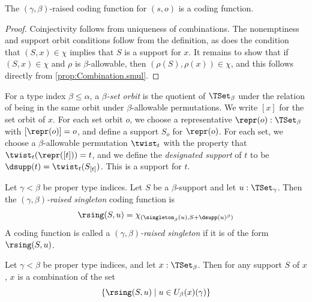 \begin{proposition}
  \label{prop:raisedCodingFunction_spec}
  The \( (\gamma,\beta) \)-raised coding function for \( (s, o) \) is a coding function.
\end{proposition}
\begin{proof}
  Coinjectivity follows from uniqueness of combinations.
  The nonemptiness and support orbit conditions follow from the definition, as does the condition that \( (S, x) \in \chi \) implies that \( S \) is a support for \( x \).
  It remains to show that if \( (S, x) \in \chi \) and \( \rho \) is \( \beta \)-allowable, then \( (\rho(S), \rho(x)) \in \chi \), and this follows directly from \cref{prop:Combination.smul}.
\end{proof}
\begin{definition}
  \label{def:designatedSupport}
  For a type index \( \beta \leq \alpha \), a \emph{\( \beta \)-set orbit} is the quotient of \( \TSet_\beta \) under the relation of being in the same orbit under \( \beta \)-allowable permutations.
  We write \( [x] \) for the set orbit of \( x \).
  For each set orbit \( o \), we choose a representative \( \repr(o) : \TSet_\beta \) with \( [\repr(o)] = o \), and define a support \( S_o \) for \( \repr(o) \).
  For each set, we choose a \( \beta \)-allowable permutation \( \twist_t \) with the property that \( \twist_t(\repr([t])) = t \), and we define the \emph{designated support} of \( t \) to be \( \dsupp(t) = \twist_t(S_{[t]}) \).
  This is a support for \( t \).
\end{definition}
\begin{definition}
  \label{def:raisedSingleton}
  Let \( \gamma < \beta \) be proper type indices.
  Let \( S \) be a \( \beta \)-support and let \( u : \TSet_\gamma \).
  Then the \emph{\( (\gamma,\beta ) \)-raised singleton} coding function is
  \[ \rsing(S, u) = \chi_{(\singleton_\beta(u), S + \dsupp(u)^\beta)} \]
  A coding function is called a \emph{\( (\gamma,\beta) \)-raised singleton} if it is of the form \( \rsing(S, u) \).
\end{definition}
\begin{proposition}
  \label{prop:raise_combination}
  Let \( \gamma < \beta \) be proper type indices, and let \( x : \TSet_\beta \).
  Then for any support \( S \) of \( x \), \( x \) is a combination of the set
  \[ \{ \rsing(S, u) \mid u \in U_\beta(x)(\gamma) \} \]
\end{proposition}
